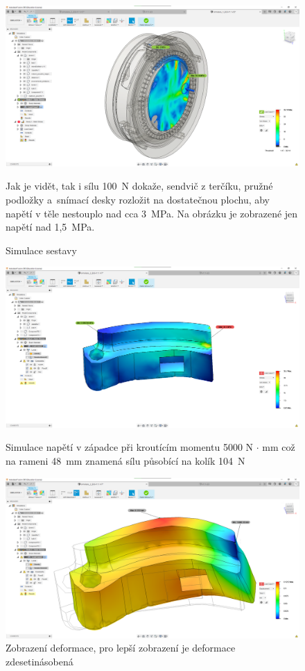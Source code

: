 \begin{figure}
    \centering
    \includegraphics[width=\textwidth]{kapitoly/obrazky/E4/machanika_tlakove_desky/simulace/zjednodusena_sestava_pri_F100N_nezobrazeno_napeti_pod_1,5MPa.png}
    \caption{Simulace sestavy}
    Jak je vidět, tak i sílu 100~N dokaže, sendvič z terčíku, pružné podložky a~snímací desky rozložit na dostatečnou plochu, aby napětí v těle nestouplo 
    nad cca 3~MPa. Na obrázku je zobrazené jen napětí nad 1,5~MPa.
    \label{fig:E4-simulace_tlakovky}
\end{figure}

\begin{figure}[h]
    \centering
    \includegraphics[width=\textwidth]{kapitoly/obrazky/E4/zapadka/simulace/napeti_D1-M5000.png}
    \caption{Simulace napětí v západce při kroutícím momentu 5000 N $\cdot$ mm což na rameni 48~mm znamená sílu působící na kolík 104~N}
    \includegraphics[width=\textwidth]{kapitoly/obrazky/E4/zapadka/simulace/Dislokace_D10-M5000.png}
    \caption{Zobrazení deformace, pro lepší zobrazení je deformace zdesetinásobená}
    \label{fig:E4-simulace_zapadky}
\end{figure}

